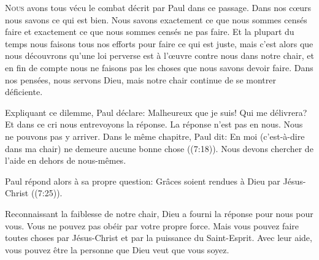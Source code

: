 



\lettrine{N}{ous} avons tous vécu le combat décrit par Paul dans ce passage.
 Dans nos c\oe{}urs nous savons ce qui est bien.
 Nous savons exactement ce que nous sommes censés faire
 et exactement ce que nous sommes censés ne pas faire.
 Et la plupart du temps nous faisons tous nos efforts pour faire
 ce qui est juste, mais c'est alors que nous découvrons qu'une loi perverse
 est à l'\oe{}uvre contre nous dans notre chair,
 et en fin de compte nous ne faisons pas les choses
 que nous savons devoir faire.
 Dans nos pensées, nous servons Dieu,
 mais notre chair continue de se montrer déficiente.

Expliquant ce dilemme, Paul déclare: 
 \Og Malheureux que je suis! Qui me délivrera? \Fg{}
 Et dans ce cri nous entrevoyons la réponse. La réponse n'est pas en nous.
 Nous ne pouvons pas y arriver. Dans le même chapitre, 
 Paul dit: 
 \Og En moi (c'est-à-dire dans ma chair) ne demeure aucune bonne chose \Fg{}
 ((7:18)).
 Nous devons chercher de l'aide en dehors de nous-mêmes.

Paul répond alors à sa propre question: 
 \Og Grâces soient rendues à Dieu par Jésus-Christ \Fg{}
 ((7:25)).

Reconnaissant la faiblesse de notre chair, Dieu a fourni la réponse
 pour nous \ocadr pour vous. Vous ne pouvez pas obéir par votre propre force.
 Mais vous pouvez faire toutes choses par Jésus-Christ et par la puissance
 du Saint-Esprit. Avec leur aide, vous pouvez être la personne que Dieu
 veut que vous soyez.

\dvrule




